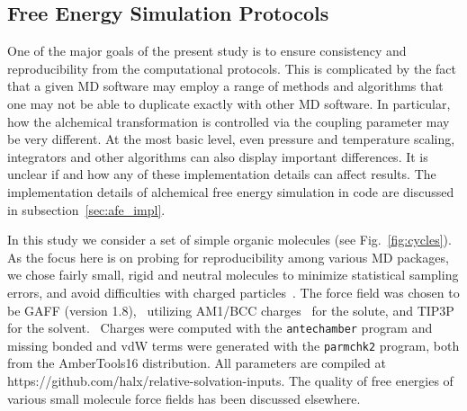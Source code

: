 \documentclass[journal=jctcce,manuscript=article]{achemso}
\newcommand{\progname}[1]{\texttt{#1}}
\begin{document}
\subsection{Free Energy Simulation Protocols}
\label{sec:rafe_protocols}

One of the major goals of the present study is to ensure
consistency and reproducibility from the computational protocols.  This is complicated by the fact
that a given MD software may employ a range of methods and algorithms that one may not be
able to duplicate exactly with other MD software.
In particular, how the alchemical transformation is controlled via the coupling parameter may be very different.
At the most basic level, even pressure and temperature scaling, integrators and other algorithms can also display important differences.
It is unclear if and how any of these implementation details can affect results.
The implementation details of alchemical free energy simulation in code are discussed in subsection~\ref{sec:afe_impl}.

In this study we consider a set of simple organic molecules (see
Fig.~\ref{fig:cycles}).  As the focus here is on probing for
reproducibility among various MD packages, we chose fairly small,
rigid and neutral molecules to minimize statistical sampling errors, and
avoid difficulties with charged
particles~\cite{rocklin_calculating_2013, JCC:JCC1050}.  The force
field was chosen to be GAFF (version
1.8),~\cite{wang_development_2004} utilizing AM1/BCC charges~ for the solute,\cite{jakalian_fast_2000,jakalian_fast_2002} and
TIP3P for the solvent.~\cite{jorgensen_comparison_1983-1}
%
%
%
%
Charges were computed with the \progname{antechamber} program and
missing bonded and vdW terms were generated with the
\progname{parmchk2} program, both from the AmberTools16 distribution.
All parameters are compiled at
https://github.com/halx/relative-solvation-inputs.
The quality of free energies of various small molecule force fields
has been discussed elsewhere.~\cite{doi:10.1021/ct300203w}
\end{document}
